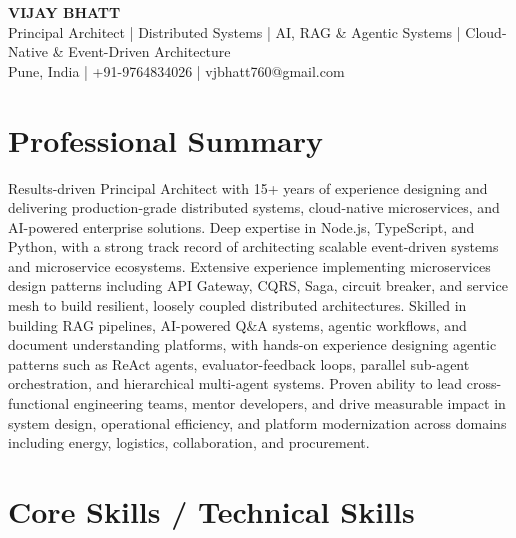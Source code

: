 \documentclass[a4paper,11pt]{article}
\begin{document}
\begin{center}
  {\LARGE\bfseries VIJAY BHATT} \\[6pt]
  {\large Principal Architect | Distributed Systems | AI, RAG \& Agentic Systems | Cloud-Native \& Event-Driven Architecture} \\[4pt]
  {Pune, India | +91-9764834026 | vjbhatt760@gmail.com}
\end{center}

\section{Professional Summary}
Results-driven Principal Architect with 15+ years of experience designing and delivering production-grade distributed systems, cloud-native microservices, and AI-powered enterprise solutions. Deep expertise in Node.js, TypeScript, and Python, with a strong track record of architecting scalable event-driven systems and microservice ecosystems. Extensive experience implementing microservices design patterns including API Gateway, CQRS, Saga, circuit breaker, and service mesh to build resilient, loosely coupled distributed architectures. Skilled in building RAG pipelines, AI-powered Q\&A systems, agentic workflows, and document understanding platforms, with hands-on experience designing agentic patterns such as ReAct agents, evaluator-feedback loops, parallel sub-agent orchestration, and hierarchical multi-agent systems. Proven ability to lead cross-functional engineering teams, mentor developers, and drive measurable impact in system design, operational efficiency, and platform modernization across domains including energy, logistics, collaboration, and procurement.

\section{Core Skills / Technical Skills}
\end{document}
